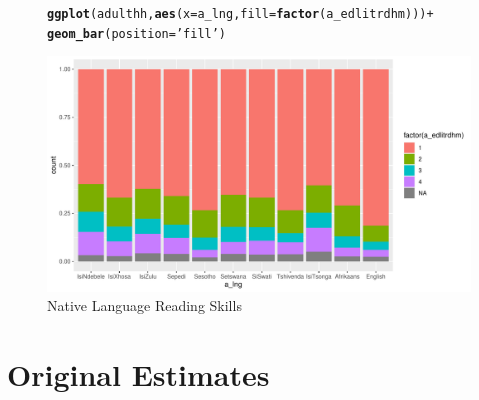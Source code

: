 \documentclass[a4paper,british]{article}\usepackage[]{graphicx}\usepackage[]{xcolor}
\makeatletter
\def\maxwidth{ %
  \ifdim\Gin@nat@width>\linewidth
    \linewidth
  \else
    \Gin@nat@width
  \fi
}
\newcommand{\hlstr}[1]{\textcolor[rgb]{0.192,0.494,0.8}{#1}}%
\newcommand{\hlopt}[1]{\textcolor[rgb]{0,0,0}{#1}}%
\newcommand{\hlstd}[1]{\textcolor[rgb]{0.345,0.345,0.345}{#1}}%
\newcommand{\hlkwc}[1]{\textcolor[rgb]{0.333,0.667,0.333}{#1}}%
\newcommand{\hlkwd}[1]{\textcolor[rgb]{0.737,0.353,0.396}{\textbf{#1}}}%
\newenvironment{kframe}{%
 \def\at@end@of@kframe{}%
 \ifinner\ifhmode%
  \def\at@end@of@kframe{\end{minipage}}%
  \begin{minipage}{\columnwidth}%
 \fi\fi%
 \def\FrameCommand##1{\hskip\@totalleftmargin \hskip-\fboxsep
 \colorbox{shadecolor}{##1}\hskip-\fboxsep
     \hskip-\linewidth \hskip-\@totalleftmargin \hskip\columnwidth}%
 \MakeFramed {\advance\hsize-\width
   \@totalleftmargin\z@ \linewidth\hsize
   \@setminipage}}%
 {\par\unskip\endMakeFramed%
 \at@end@of@kframe}
\newenvironment{knitrout}{}{} %
\makeatother
\begin{document}
\begin{figure}[H]
\caption{Native Language Reading Skills}
\label{fig:rdhm}

\begin{knitrout}
\color{fgcolor}\begin{kframe}
\begin{alltt}
\hlkwd{ggplot}\hlstd{(adulthh,} \hlkwd{aes}\hlstd{(}\hlkwc{x} \hlstd{= a_lng,} \hlkwc{fill} \hlstd{=} \hlkwd{factor}\hlstd{(a_edlitrdhm)) )} \hlopt{+}
        \hlkwd{geom_bar}\hlstd{(}\hlkwc{position} \hlstd{=} \hlstr{'fill'}\hlstd{)}
\end{alltt}
\end{kframe}
\includegraphics[width=\maxwidth]{../misc/latex-read_native-1} 
\end{knitrout}
\end{figure}


\section{Original Estimates}
\end{document}
